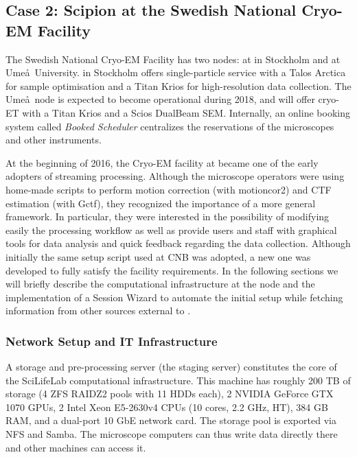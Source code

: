 
\subsection{Case 2: Scipion at the Swedish National Cryo-EM Facility}

The Swedish National Cryo-EM Facility %
has two nodes: at \scilifelab in Stockholm and at Ume\aa\ University. \scilifelab in Stockholm offers single-particle service with a 
Talos Arctica for sample optimisation and a Titan Krios for high-resolution data collection. The Ume\aa\ node is expected to become operational during 2018, and will offer cryo-ET with a Titan Krios and a Scios DualBeam SEM.
Internally, an online booking system called \emph{Booked Scheduler} centralizes the reservations of the microscopes and other instruments. 

At the beginning of 2016, the Cryo-EM facility at \scilifelab became one of the early adopters of \scipion streaming processing. Although the microscope operators were using home-made scripts to perform motion correction (with motioncor2) and CTF estimation (with Gctf), they recognized the importance of a more general
framework. In particular, they were interested in the possibility of modifying easily the processing workflow as well as provide users and staff with  graphical tools for data analysis and quick feedback regarding the data collection.
Although initially the same setup script used at
CNB was adopted, a new one was developed to fully satisfy the facility
requirements. In the following sections we will briefly describe the computational infrastructure at the \scilifelab node and the implementation of a Session Wizard to automate the initial setup while fetching information from other sources external to \scipion. 

\subsubsection{Network Setup and IT Infrastructure}
A storage and pre-processing server (the staging
server) constitutes the core of the SciLifeLab computational infrastructure.
 This machine has roughly 200 TB of storage (4 ZFS RAIDZ2 pools with 11 HDDs each), 2 NVIDIA GeForce GTX 1070 GPUs, 2 Intel Xeon E5-2630v4 CPUs (10 cores, 2.2 GHz, HT), 384 GB RAM, and a dual-port 10 GbE network card. The storage pool is exported via NFS and Samba. The microscope computers can thus write data directly there and other machines can access it.
 
